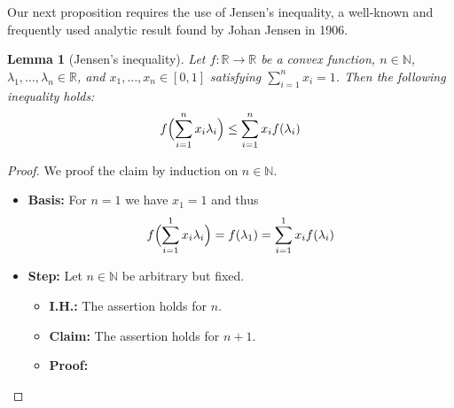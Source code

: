 \documentclass[hidelinks]{article}
\theoremstyle{plain}
\newtheorem{lem}[thm]{Lemma}
\theoremstyle{definition}
\theoremstyle{rem}
\begin{document}
Our next proposition requires the use of Jensen's inequality, a well-known and frequently used analytic result found by Johan Jensen in 1906.
\begin{lem}[Jensen's inequality]
Let $f:\mathbb{R}\rightarrow\mathbb{R}$ be a convex function, $n\in\mathbb{N}$, $\lambda_1,\ldots,\lambda_n\in\mathbb{R}$, and $x_1,\ldots,x_n\in[0,1]$ satisfying $\sum\limits_{i=1}^{n}x_i=1$. Then the following inequality holds:
\begin{equation*}
	f\Bigl(\sum_{i=1}^n x_i \lambda_i\Bigr) \leq \sum_{i=1}^n x_i f(\lambda_i)
\end{equation*}
\end{lem}
\begin{proof}
We proof the claim by induction on $n\in\mathbb{N}$.
\begin{itemize}
\item\textbf{Basis:} For $n=1$ we have $x_1=1$ and thus
\begin{equation*}
	f\Bigl(\sum\limits_{i=1}^1x_i\lambda_i\Bigr)=f(\lambda_1)=\sum\limits_{i=1}^1x_if(\lambda_i)
\end{equation*}
\item\textbf{Step:} Let $n\in\mathbb{N}$ be arbitrary but fixed.
\begin{itemize}
	\item\textbf{I.H.:} The assertion holds for $n$.
	\item\textbf{Claim:} The assertion holds for $n+1$.
	\item\textbf{Proof:}
\end{itemize}
\end{itemize}
\end{proof}
\end{document}
